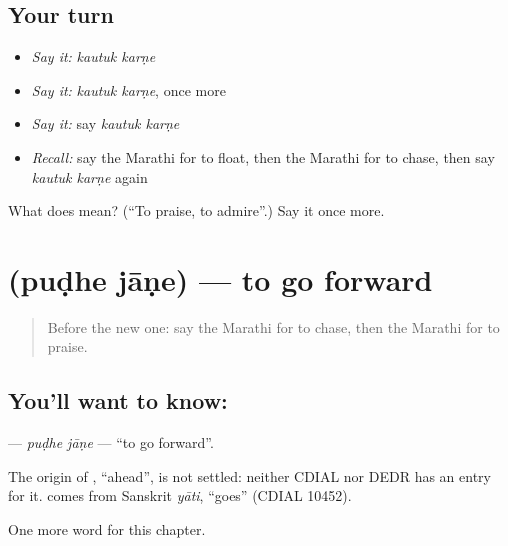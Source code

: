 \subsection*{Your turn}
\begin{itemize}
\raggedright
  \item \emph{Say it:} \emph{kautuk karṇe}
  \item \emph{Say it:} \emph{kautuk karṇe}, once more
  \item \emph{Say it:} say \emph{kautuk karṇe}
  \item \emph{Recall:} say the Marathi for to float, then the Marathi for to chase, then say \emph{kautuk karṇe} again
\end{itemize}

\begin{tcolorbox}[breakable,colback=teal!4,colframe=teal!35!black,title={Before you move on}]
What does   mean? (\textquotedblleft{}To praise, to admire\textquotedblright{}.) Say it once more.
\end{tcolorbox}
\section[\texorpdfstring{\mr{पुढे} \mr{जाणे} (puḍhe jāṇe)}{पुढे जाणे (puḍhe jāṇe)}]{  (puḍhe jāṇe) — to go forward}

\label{lesson:MR-C228-pudhe-jane}



\begin{quote}
Before the new one: say the Marathi for to chase, then the Marathi for to praise.
\end{quote}

\subsection*{You'll want to know:  }
\textbf{ } — \emph{puḍhe jāṇe} — \textquotedblleft{}to go forward\textquotedblright{}.

\begin{cousinweb}
The origin of \textbf{}, \textquotedblleft{}ahead\textquotedblright{}, is not settled: neither CDIAL nor DEDR has an entry for it. \textbf{} comes from Sanskrit \emph{yāti}, \textquotedblleft{}goes\textquotedblright{} (CDIAL 10452).
\end{cousinweb}

\begin{grammarlens}[title={What you've built}]
One more word for this chapter.
\end{grammarlens}


